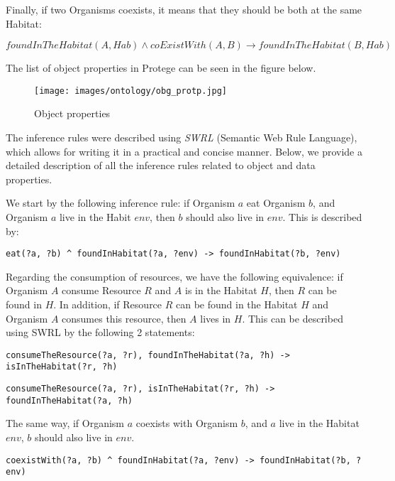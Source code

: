 Finally, if two Organisms coexists, it means that they should be both at the same Habitat:

$$foundInTheHabitat(A, Hab)
\land coExistWith(A, B) \rightarrow
foundInTheHabitat(B, Hab)$$

The list of object properties in Protege can be seen in the figure below.

\begin{figure}[H]
    \centering
    \texttt{[image: images/ontology/obg\_protp.jpg]}
    \caption{Object properties}
    \label{fig:obj}
\end{figure}

The inference rules were described using \textit{SWRL} (Semantic Web Rule Language), which allows for writing it in a practical and concise manner. Below, we provide a detailed description of all the inference rules related to object and data properties.
\bigskip

We start by the following inference rule: if Organism $a$ eat Organism $b$, and Organism $a$ live in the Habit $env$, then $b$ should also live in $env$. This is described by:
\bigskip

\begin{lstlisting}[frame=single,breaklines=true]
eat(?a, ?b) ^ foundInHabitat(?a, ?env) -> foundInHabitat(?b, ?env)
\end{lstlisting}

Regarding the consumption of resources, we have the following equivalence: if Organism $A$ consume Resource $R$ and $A$ is in the Habitat $H$, then $R$ can be found in $H$. In addition, if Resource $R$ can be found in the Habitat $H$ and Organism $A$ consumes this resource, then $A$ lives in $H$. This can be described using SWRL by the following 2 statements:
\bigskip

\begin{lstlisting}[frame=single,breaklines=true]
consumeTheResource(?a, ?r), foundInTheHabitat(?a, ?h) -> isInTheHabitat(?r, ?h)
\end{lstlisting}

\begin{lstlisting}[frame=single,breaklines=true]
consumeTheResource(?a, ?r), isInTheHabitat(?r, ?h) -> foundInTheHabitat(?a, ?h)
\end{lstlisting}


The same way, if Organism $a$ coexists with Organism $b$, and $a$ live in the Habitat $env$, $b$ should also live in $env$.
\bigskip

\begin{lstlisting}[frame=single,breaklines=true]
coexistWith(?a, ?b) ^ foundInHabitat(?a, ?env) -> foundInHabitat(?b, ?env)
\end{lstlisting}


